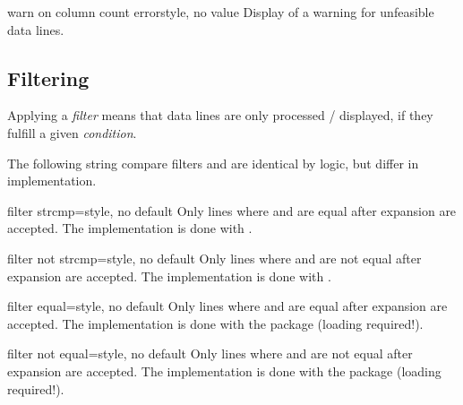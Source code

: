 \documentclass[a4paper,11pt]{ltxdoc}
\begin{document}
\begin{docCsvKey}{warn on column count error}{}{style, no value}
  Display of a warning for unfeasible data lines.
\end{docCsvKey}


\clearpage
\subsection{Filtering}\label{subsec:filtering}%

Applying a \emph{filter} means that data lines are only processed / displayed,
if they fulfill a given \emph{condition}.

The following string compare filters  and
 are identical by logic, but differ in implementation.

\begin{docCsvKey}{filter strcmp}{=}{style, no default}
  Only lines where  and  are equal after expansion
  are accepted.
  The implementation is done with .
\begin{dispExample}
\end{dispExample}
\end{docCsvKey}


\begin{docCsvKey}{filter not strcmp}{=}{style, no default}
  Only lines where  and  are not equal after expansion
  are accepted.
  The implementation is done with .
\end{docCsvKey}


\begin{docCsvKey}{filter equal}{=}{style, no default}
  Only lines where  and  are equal after expansion
  are accepted.
  The implementation is done with the  package (loading required!).
\end{docCsvKey}


\begin{docCsvKey}{filter not equal}{=}{style, no default}
  Only lines where  and  are not equal after expansion
  are accepted.
  The implementation is done with the  package (loading required!).
\end{docCsvKey}
\end{document}
